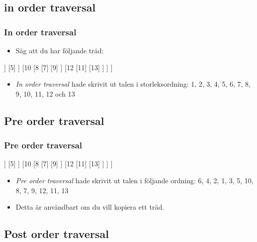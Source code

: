 \documentclass[aspectratio=169]{beamer}
\begin{document}
\subsection{in order traversal}

\begin{frame}[fragile]
	\frametitle{In order traversal}
	
	\begin{itemize}
		\item Säg att du har följande träd:
	\end{itemize}
	
	\centering
	\begin{forest}
		[6
			[4
				[2
					[1]
					[3]
				]
				[5]
			]
			[10
				[8
					[7]
					[9]
				]	
				[12
					[11]
					[13]
				]
			]
		]
	\end{forest}
	
	\begin{itemize}
		\item \textit{In order traversal} hade skrivit ut talen i storleksordning: 1, 2, 3, 4, 5, 6, 7, 8, 9, 10, 11, 12 och 13
	\end{itemize}

\end{frame}

\subsection{Pre order traversal}

\begin{frame}[fragile]
	\frametitle{Pre order traversal}

	\centering
	\begin{forest}
		[6
			[4
				[2
					[1]
					[3]
				]
				[5]
			]
			[10
				[8
					[7]
					[9]
				]	
				[12
					[11]
					[13]
				]
			]
		]
	\end{forest}
	
	\begin{itemize}
		\item \textit{Pre order traversal} hade skrivit ut talen i följande ordning: 6, 4, 2, 1, 3, 5, 10, 8, 7, 9, 12, 11, 13
		\item Detta är användbart om du vill kopiera ett träd. 
	\end{itemize}

\end{frame}

\subsection{Post order traversal}
\end{document}
